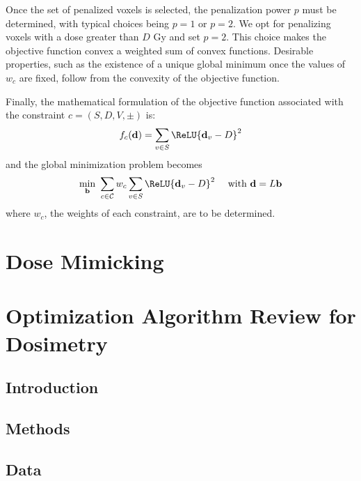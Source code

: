 Once the set of penalized voxels is selected, the penalization power $p$ must be determined, with typical choices being $p=1$ or $p=2$.
We opt for penalizing voxels with a dose greater than $D$ Gy and set $p=2$.
This choice makes the objective function convex a weighted sum of convex functions.
Desirable properties, such as the existence of a unique global minimum once the values of $w_c$ are fixed, follow from the convexity of the objective function.

Finally, the mathematical formulation of the objective function associated with the constraint $c = \left( S, D, V, \pm \right)$ is:
$$f_c(\mathbf{d}) = \sum_{v \in S} \ReLU{\mathbf{d}_v - D}^2$$
and the global minimization problem becomes
$$
\min_{\mathbf{b}} \ \sum_{c \in \mathcal{C}} w_c \sum_{v \in S} \ReLU{\mathbf{d}_v - D}^2
\quad \text{ with }
\mathbf{d} = L\mathbf{b}
$$
where $w_c$, the weights of each constraint, are to be determined.

\section{Dose Mimicking}

\section{Optimization Algorithm Review for Dosimetry}
\subsection{Introduction}

\subsection{Methods}

\subsection{Data}
